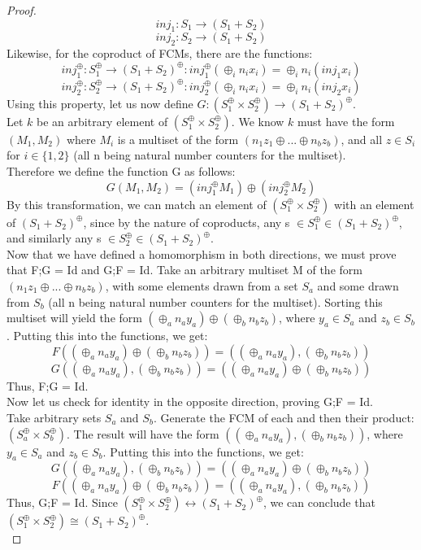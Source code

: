 \begin{lemma}
\begin{proof}
\[inj_1: S_1 \rightarrow (S_1 + S_2) \]
\[inj_2: S_2 \rightarrow (S_1 + S_2)\]
Likewise, for the coproduct of FCMs, there are the functions: \\
\[inj^\oplus_1: S_1^\oplus \rightarrow (S_1 + S_2)^\oplus  :  inj^\oplus_1(\oplus_i n_i x_i) = \oplus_i n_i(inj_1 x_i)\]
\[inj^\oplus_2: S_2^\oplus \rightarrow (S_1 + S_2)^\oplus  :  inj^\oplus_2(\oplus_i n_i x_i) = \oplus_i n_i(inj_2 x_i)\]
Using this property, let us now define $G: (S_1 ^\oplus \times S_2 ^\oplus) \rightarrow (S_1 + S_2)^\oplus$.\\
Let $k$ be an arbitrary element of $(S_1 ^\oplus \times S_2 ^\oplus)$. We know $k$ must have the form $(M_1 , M_2)$ where $M_i$ is a multiset of the form $(n_1z_1 \oplus ... \oplus n_bz_b)$, and all $z \in S_i$ for $i\in\{1, 2\}$ (all n being natural number counters for the multiset).\\
Therefore we define the function G as follows:\\
\[G(M_1, M_2) = (inj_1^\oplus M_1) \oplus (inj_2^\oplus M_2)\]
By this transformation, we can match an element of $(S_1 ^\oplus \times S_2 ^\oplus)$ with an element of $(S_1 + S_2)^\oplus$, since by the nature of coproducts, any s $\in S_1^\oplus \in (S_1+S_2)^\oplus$, and similarly any s $\in S_2^\oplus \in (S_1+S_2)^\oplus$.\bigskip \\
Now that we have defined a homomorphism in both directions, we must prove that F;G = Id and G;F = Id. Take an arbitrary multiset M of the form $(n_1z_1 \oplus ... \oplus n_bz_b)$, with some elements drawn from a set $S_a$ and some drawn from $S_b$ (all n being natural number counters for the multiset). Sorting this multiset will yield the form $(\oplus_a n_a y_a) \oplus (\oplus_b n_b z_b)$, where $y_a \in S_a$ and $z_b \in S_b$. Putting this into the functions, we get:\\ 
\[F((\oplus_a n_a y_a) \oplus (\oplus_b n_b z_b)) = ((\oplus_a n_a y_a), (\oplus_b n_b z_b))\]
\[G((\oplus_a n_a y_a), (\oplus_b n_b z_b)) = ((\oplus_a n_a y_a) \oplus (\oplus_b n_b z_b))\] 
Thus, F;G = Id.\\
Now let us check for identity in the opposite direction, proving G;F = Id.\\
Take arbitrary sets $S_a$ and $S_b$. Generate the FCM of each and then their product: $(S_a^\oplus \times S_b^\oplus)$. The result will have the form $((\oplus_a n_a y_a), (\oplus_b n_b z_b))$, where $y_a \in S_a$ and $z_b \in S_b$. Putting this into the functions, we get:\\ 
\[G((\oplus_a n_a y_a), (\oplus_b n_b z_b)) = ((\oplus_a n_a y_a) \oplus (\oplus_b n_b z_b))\] 
\[F((\oplus_a n_a y_a) \oplus (\oplus_b n_b z_b)) = ((\oplus_a n_a y_a), (\oplus_b n_b z_b))\]
Thus, G;F = Id. 
Since $(S_1 ^\oplus \times S_2 ^\oplus) \leftrightarrow (S_1 + S_2)^\oplus$, we can conclude that $(S_1 ^\oplus \times S_2 ^\oplus) \cong (S_1 + S_2)^\oplus$.\\
\end{proof}
%
\end{lemma}
